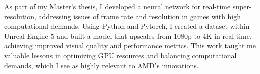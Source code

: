 As part of my Master’s thesis, I developed a neural network for real-time super-resolution, 
addressing issues of frame rate and resolution in games with high computational demands. 
Using Python and Pytorch, I created a dataset within Unreal Engine 5 and built a model 
that upscales from 1080p to 4K in real-time, achieving improved visual quality and performance metrics. 
This work taught me valuable lessons in optimizing GPU resources and balancing computational demands, 
which I see as highly relevant to AMD's innovations.